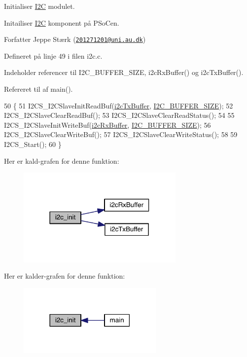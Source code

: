 Initialiser \hyperlink{class_i2_c}{I2C} modulet. 

Initailiser \hyperlink{class_i2_c}{I2C} komponent på P\+SoC\textquotesingle{}en.

\begin{DoxyAuthor}{Forfatter}
Jeppe Stærk (\href{mailto:201271201@uni.au.dk}{\tt 201271201@uni.\+au.\+dk}) 
\end{DoxyAuthor}


Defineret på linje 49 i filen i2c.\+c.



Indeholder referencer til I2\+C\+\_\+\+B\+U\+F\+F\+E\+R\+\_\+\+S\+I\+ZE, i2c\+Rx\+Buffer() og i2c\+Tx\+Buffer().



Refereret til af main().


\begin{DoxyCode}
50 \{
51   I2CS\_I2CSlaveInitReadBuf(\hyperlink{class_i2_c_a58ba88cddd7843f12a40a87c998f00da}{i2cTxBuffer}, \hyperlink{i2c_8h_a6458dbf193a0eef0470fc1b08400bfcd}{I2C\_BUFFER\_SIZE});
52   I2CS\_I2CSlaveClearReadBuf();
53   I2CS\_I2CSlaveClearReadStatus();
54   
55   I2CS\_I2CSlaveInitWriteBuf(\hyperlink{class_i2_c_a711782550427eea544dabe5394d79a9b}{i2cRxBuffer}, \hyperlink{i2c_8h_a6458dbf193a0eef0470fc1b08400bfcd}{I2C\_BUFFER\_SIZE});
56   I2CS\_I2CSlaveClearWriteBuf();
57   I2CS\_I2CSlaveClearWriteStatus();
58   
59   I2CS\_Start();
60 \}
\end{DoxyCode}


Her er kald-\/grafen for denne funktion\+:
\nopagebreak
\begin{figure}[H]
\begin{center}
\leavevmode
\includegraphics[width=231pt]{d4/d47/class_i2_c_a64303230bf4843297e7ac37ac236ca04_cgraph}
\end{center}
\end{figure}




Her er kalder-\/grafen for denne funktion\+:
\nopagebreak
\begin{figure}[H]
\begin{center}
\leavevmode
\includegraphics[width=201pt]{d4/d47/class_i2_c_a64303230bf4843297e7ac37ac236ca04_icgraph}
\end{center}
\end{figure}


